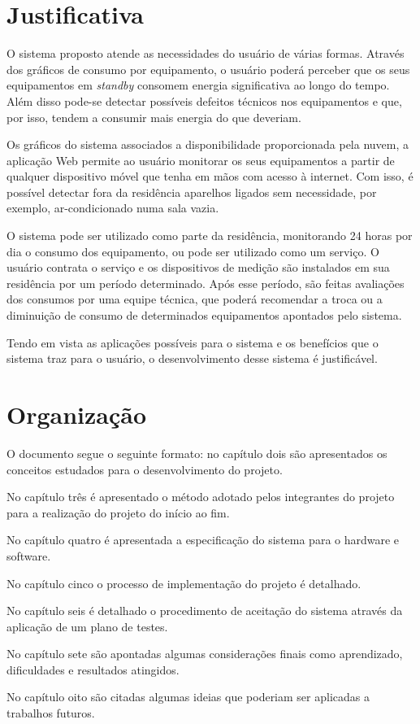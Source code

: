 \section{Justificativa}
\label{Sec:justificativa}
%
O sistema proposto atende as necessidades do usuário de várias formas. Através dos gráficos de consumo por equipamento, o usuário poderá perceber que os seus equipamentos em \textit{standby} consomem energia significativa ao longo do tempo. Além disso pode-se detectar possíveis defeitos técnicos nos equipamentos e que, por isso, tendem a consumir mais energia do que deveriam.

Os gráficos do sistema associados a disponibilidade proporcionada pela nuvem, a aplicação Web permite ao usuário monitorar os seus equipamentos a partir de qualquer dispositivo móvel que tenha em mãos com acesso à internet. Com isso, é possível detectar fora da residência aparelhos ligados sem necessidade, por exemplo, ar-condicionado numa sala vazia.

O sistema pode ser utilizado como parte da residência, monitorando 24 horas por dia o consumo dos equipamento, ou pode ser utilizado como um serviço. O usuário contrata o serviço e os dispositivos de medição são instalados em sua residência por um período determinado. Após esse período, são feitas avaliações dos consumos por uma equipe técnica, que poderá recomendar a troca ou a diminuição de consumo de determinados equipamentos apontados pelo sistema.

Tendo em vista as aplicações possíveis para o sistema e os benefícios que o sistema traz para o usuário, o desenvolvimento desse sistema é justificável.
%
\section{Organização}
\label{Sec:organizacao}
%
O documento segue o seguinte formato: no capítulo dois são apresentados os conceitos estudados para o desenvolvimento do projeto.

No capítulo três é apresentado o método adotado pelos integrantes do projeto para a realização do projeto do início ao fim.

No capítulo quatro é apresentada a especificação do sistema para o hardware e software.

No capítulo cinco o processo de implementação do projeto é detalhado.

No capítulo seis é detalhado o procedimento de aceitação do sistema através da aplicação de um plano de testes.

No capítulo sete são apontadas algumas considerações finais como aprendizado, dificuldades e resultados atingidos.

No capítulo oito são citadas algumas ideias que poderiam ser aplicadas a trabalhos futuros.

